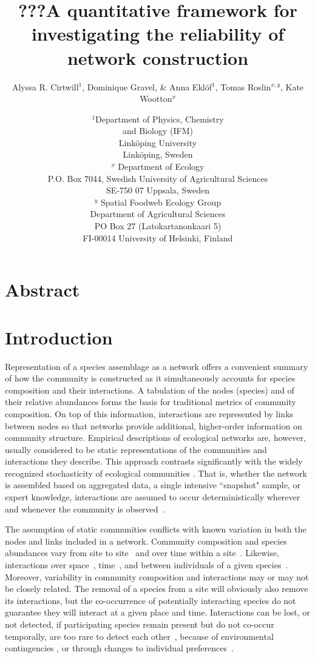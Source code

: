 \documentclass[12pt]{article}
\title{???A quantitative framework for investigating the reliability of network construction}
\author{Alyssa R. Cirtwill$^{1}$, Dominique Gravel, \&  Anna Ekl\"{o}f$^{1}$, Tomas Roslin$^{x,y}$, Kate Wootton$^{x}$}
\date{\small$^1$Department of Physics, Chemistry\\ 
and Biology (IFM)\\ 
Link\"{o}ping University\\
Link\"{o}ping, Sweden\\
\medskip $^x$ Department of Ecology\\ P.O. Box 7044, Swedish University of Agricultural Sciences \\ SE-750 07 Uppsala, Sweden \\
\medskip $^y$ Spatial Foodweb Ecology Group\\ Department of Agricultural Sciences \\ PO Box 27 (Latokartanonkaari 5)\\ FI-00014 University of Helsinki, Finland \\
}
\begin{document}
 
\maketitle 
\raggedright
\setlength{\parindent}{15pt} 


\section*{Abstract}



\section*{Introduction}

    Representation of a species assemblage as a network offers a convenient summary of how the community is constructed as it simultaneously accounts for species composition and their interactions. A tabulation of the nodes (species) and of their relative abundances forms the basis for traditional metrics of community composition. On top of this information, interactions are represented by links between nodes so that networks provide additional, higher-order information on community structure. Empirical descriptions of ecological networks are, however, usually considered to be static representations of the communities and interactions they describe. This approach contrasts significantly with the widely recognized stochasticity of ecological communities \citep{Gotelli2000}. That is, whether the network is assembled based on aggregated data, a single intensive ``snapshot" sample, or expert knowledge, interactions are assumed to occur deterministically wherever and whenever the community is observed~\citep{Olesen2011a}. 


    The assumption of static communities conflicts with known variation in both  the nodes and links included in a network. Community composition and species abundances vary from site to site~\citep{Baiser2012} and over time within a site~\citep{Olesen2011a}. Likewise, interactions over space~\citep{Kitching1987,Baiser2012}, time~\citep{Kitching1987,Olesen2011a}, and between individuals of a given species~\citep{Pires2011a,Fodrie2015,Novak2015}. Moreover, variability in community composition and interactions may or may not be closely related. The removal of a species from a site will obviously also remove its interactions, but the co-occurrence of potentially interacting species do not guarantee they will interact at a given place and time. Interactions can be lost, or not detected, if participating species remain present but do not co-occur temporally, are too rare to detect each other~\citep{Tylianakis2010}, because of environmental contingencies \citep{Poisot2015}, or through changes to individual preferences~\citep{Fodrie2015}. 
\end{document}
